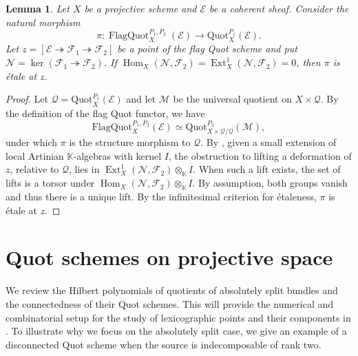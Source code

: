 \documentclass[leqno,11pt,a4paper]{amsart}
\newtheorem{lemma}[lemma]{Lemma}
\theoremstyle{definition}
\numberwithin{equation}{section}
\newcommand{\kk}{\mathbb{K}}
\newcommand{\Quot}{\mathrm{Quot}}
\newcommand{\EE}{\mathscr{E}}
\newcommand{\FF}{\mathscr{F}}
\newcommand{\MM}{\mathscr{M}}
\newcommand{\NN}{\mathscr{N}}
\newcommand{\QQ}{\mathcal{Q}}
\DeclareMathOperator{\Hom}{Hom}
\DeclareMathOperator{\Ext}{Ext}
\begin{document}
\begin{lemma}\label{Deformation_theory_flag}
Let $X$ be a projective scheme and $\EE$ be a coherent sheaf. Consider the natural morphism
$$
\pi:
\operatorname{FlagQuot}^{P_1,P_2}_X(\EE)
\longrightarrow
\Quot^{P_1}_X(\EE).
$$
Let $z=[\EE\twoheadrightarrow\FF_1\twoheadrightarrow \FF_2]$
be a point of the flag Quot scheme and put
$\NN=\ker(\FF_1\twoheadrightarrow\FF_2)$.
If $\Hom_X(\NN,\FF_2)=\Ext^1_X(\NN,\FF_2)=0$, then $\pi$ is \'etale at $z$.
\end{lemma}
\begin{proof}
Let $\QQ=\Quot_X^{P_1}(\EE)$ and let $\MM$ be the universal quotient on $X\times \QQ$. 
By the definition of the flag Quot functor, we have
$$
\mathrm{FlagQuot}_X^{P_1,P_2}(\EE) \simeq \Quot_{X\times \QQ/\QQ}^{P_2}(\MM),
$$
under which $\pi$ is the structure morphism to $\QQ$. 
By \cite[Lemma 2.2.6]{HL}, given a small extension of local Artinian $\kk$-algebras with kernel $I$, the obstruction to lifting a deformation of $z$, relative to $\QQ$, lies in $\Ext^1_X(\NN,\FF_2)\otimes_{\kk} I$.
When such a lift exists, the set of lifts is a torsor under $\Hom_X(\NN,\FF_2)\otimes_{\kk} I$.
By assumption, both groups vanish and thus there is a unique lift.
By the infinitesimal criterion for \'etaleness, $\pi$ is \'etale at $z$.
\end{proof}



\section{Quot schemes on projective space}
We review the Hilbert polynomials of quotients of absolutely split bundles and the connectedness of their Quot schemes.
This will provide the numerical and combinatorial setup for the study of lexicographic points and their components in . 
To illustrate why we focus on the absolutely split case, we give an example of a disconnected Quot scheme when the source is indecomposable of rank two.
\end{document}
